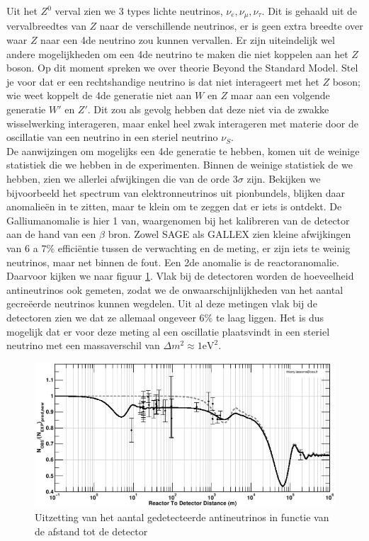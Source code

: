 \documentclass[../main.tex]{subfiles}
\begin{document}
Uit het $Z^0$ verval zien we 3 types lichte neutrinos, $\nu_e,\nu_\mu,\nu_\tau$. Dit is gehaald uit de vervalbreedtes van $Z$ naar de verschillende neutrinos, er is geen extra breedte over waar $Z$ naar een 4de neutrino zou kunnen vervallen. Er zijn uiteindelijk wel andere mogelijkheden om een 4de neutrino te maken die niet koppelen aan het $Z$ boson. Op dit moment spreken we over theorie Beyond the Standard Model. Stel je voor dat er een rechtshandige neutrino is dat niet interageert met het $Z$ boson; wie weet koppelt de 4de generatie niet aan $W$ en $Z$ maar aan een volgende generatie $W'$ en $Z'$. Dit zou als gevolg hebben dat deze niet via de zwakke wisselwerking interageren, maar enkel heel zwak interageren met materie door de oscillatie van een neutrino in een steriel neutrino $\nu_S$.\\
De aanwijzingen om mogelijks een 4de generatie te hebben, komen uit de weinige statistiek die we hebben in de experimenten. Binnen de weinige statistiek de we hebben, zien we allerlei afwijkingen die van de orde $3\sigma$ zijn. Bekijken we bijvoorbeeld het spectrum van elektronneutrinos uit pionbundels, blijken daar anomalieën in te zitten, maar te klein om te zeggen dat er iets is ontdekt. De Galliumanomalie is hier 1 van, waargenomen bij het kalibreren van de detector aan de hand van een $\beta$ bron. Zowel SAGE als GALLEX zien kleine afwijkingen van 6 a 7\% efficiëntie tussen de verwachting en de meting, er zijn iets te weinig neutrinos, maar net binnen de fout. Een 2de anomalie is de reactoranomalie. Daarvoor kijken we naar figuur \ref{fig:neutrinos/reactor_anomalie}. Vlak bij de detectoren worden de hoeveelheid antineutrinos ook gemeten, zodat we de onwaarschijnlijkheden van het aantal gecreëerde neutrinos kunnen wegdelen. Uit al deze metingen vlak bij de detectoren zien we dat ze allemaal ongeveer 6\% te laag liggen. Het is dus mogelijk dat er voor deze meting al een oscillatie plaatsvindt in een steriel neutrino met een massaverschil van $\Delta m^2\approx 1\text{eV}^2$.

\begin{figure}[h]
    \centering
    \includegraphics[width=0.7\linewidth]{neutrinos/reactor_anomalie.png}
    \caption{Uitzetting van het aantal gedetecteerde antineutrinos in functie van de afstand tot de detector}%
    \label{fig:neutrinos/reactor_anomalie}
\end{figure}
\end{document}
